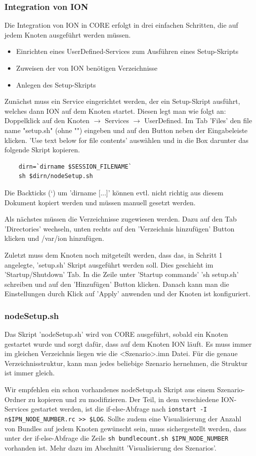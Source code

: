 \documentclass{article}
\begin{document}
{\subsubsection{Integration von ION}
Die Integration von ION in CORE erfolgt in drei einfachen Schritten, die auf jedem Knoten ausgeführt werden müssen.
\begin{itemize}
\item Einrichten eines UserDefined-Services zum Ausführen eines Setup-Skripts
\item Zuweisen der von ION benötigen Verzeichnisse
\item Anlegen des Setup-Skripts
\end{itemize}\par
Zunächst muss ein Service eingerichtet werden, der ein Setup-Skript ausführt, welches dann ION auf dem Knoten startet. Diesen legt man wie folgt an: Doppelklick auf den Knoten $\rightarrow$ Services $\rightarrow$ UserDefined. Im Tab 'Files' den file name "setup.sh" (ohne "") eingeben und auf den Button neben der Eingabeleiste klicken. 'Use text below for file contents' auswählen und in die Box darunter das folgende Skript kopieren.
\begin{verbatim}
    dirn=`dirname $SESSION_FILENAME`
    sh $dirn/nodeSetup.sh
\end{verbatim}
Die Backticks (`) um 'dirname [...]' können evtl. nicht richtig aus diesem Dokument kopiert werden und müssen manuell gesetzt werden.\par
Als nächstes müssen die Verzeichnisse zugewiesen werden. Dazu auf den Tab 'Directories' wechseln, unten rechts auf den 'Verzeichnis hinzufügen' Button klicken und /var/ion hinzufügen.\par
Zuletzt muss dem Knoten noch mitgeteilt werden, dass das, in Schritt 1 angelegte, 'setup.sh' Skript ausgeführt werden soll. Dies geschieht im 'Startup/Shutdown' Tab. In die Zeile unter 'Startup commands' 'sh setup.sh' schreiben und auf den 'Hinzufügen' Button klicken. Danach kann man die Einstellungen durch Klick auf 'Apply' anwenden und der Knoten ist konfiguriert.
\subsubsection{nodeSetup.sh}
Das Skript 'nodeSetup.sh' wird von CORE ausgeführt, sobald ein Knoten gestartet wurde und sorgt dafür, dass auf dem Knoten ION läuft. Es muss immer im gleichen Verzeichnis liegen wie die <Szenario>.imn Datei. Für die genaue Verzeichnisstruktur, kann man jedes beliebige Szenario hernehmen, die Struktur ist immer gleich.\par
Wir empfehlen ein schon vorhandenes nodeSetup.sh Skript aus einem Szenario-Ordner zu kopieren und zu modifizieren. Der Teil, in dem verschiedene ION-Services gestartet werden, ist die if-else-Abfrage nach \texttt{ionstart -I n\$IPN\_NODE\_NUMBER.rc >> \$LOG}. Sollte zudem eine Visualisierung der Anzahl von Bundles auf jedem Knoten gewünscht sein, muss sichergestellt werden, dass unter der if-else-Abfrage die Zeile \texttt{sh bundlecount.sh \$IPN\_NODE\_NUMBER} vorhanden ist. Mehr dazu im Abschnitt 'Visualisierung des Szenarios'.
}
\end{document}
